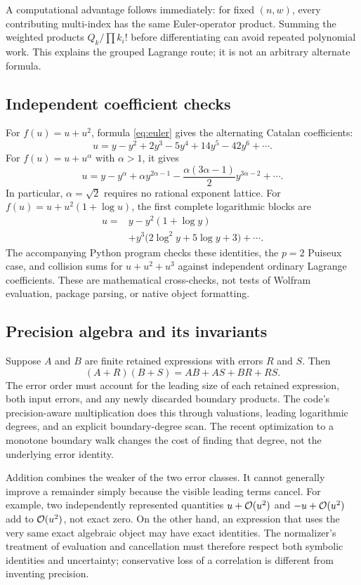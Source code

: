 A computational advantage follows immediately: for fixed $(n,w)$, every contributing multi-index has the same Euler-operator product. Summing the weighted products $Q_k/\prod k_i!$ before differentiating can avoid repeated polynomial work. This explains the grouped Lagrange route; it is not an arbitrary alternate formula.

\subsection{Independent coefficient checks}
For $f(u)=u+u^2$, formula \eqref{eq:euler} gives the alternating Catalan coefficients:
\[
 u=y-y^2+2y^3-5y^4+14y^5-42y^6+\cdots.
\]
For $f(u)=u+u^\alpha$ with $\alpha>1$, it gives
\[
 u=y-y^\alpha+\alpha y^{2\alpha-1}
 -\frac{\alpha(3\alpha-1)}2 y^{3\alpha-2}+\cdots.
\]
In particular, $\alpha=\sqrt2$ requires no rational exponent lattice. For
$f(u)=u+u^2(1+\log u)$, the first complete logarithmic blocks are
\begin{align*}
 u={}&y-y^2(1+\log y)\\
 &+y^3\bigl(2\log^2y+5\log y+3\bigr)+\cdots.
\end{align*}
The accompanying Python program checks these identities, the $p=2$ Puiseux case, and collision sums for $u+u^2+u^3$ against independent ordinary Lagrange coefficients. These are mathematical cross-checks, not tests of Wolfram evaluation, package parsing, or native object formatting.

\subsection{Precision algebra and its invariants}
Suppose $A$ and $B$ are finite retained expressions with errors $R$ and $S$. Then
\[
 (A+R)(B+S)=AB+AS+BR+RS.
\]
The error order must account for the leading size of each retained expression, both input errors, and any newly discarded boundary products. The code's precision-aware multiplication does this through valuations, leading logarithmic degrees, and an explicit boundary-degree scan. The recent optimization to a monotone boundary walk changes the cost of finding that degree, not the underlying error identity.\cite{core}

Addition combines the weaker of the two error classes. It cannot generally improve a remainder simply because the visible leading terms cancel. For example, two independently represented quantities $u+\mathcal O(u^2)$ and $-u+\mathcal O(u^2)$ add to $\mathcal O(u^2)$, not exact zero. On the other hand, an expression that uses the very same exact algebraic object may have exact identities. The normalizer's treatment of evaluation and cancellation must therefore respect both symbolic identities and uncertainty; conservative loss of a correlation is different from inventing precision.\cite{arithmetic}

